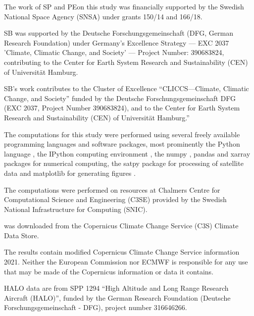 \documentclass[journal abbreviation, manuscript]{copernicus}
\begin{document}
\begin{acknowledgements}

The work of SP and PEon this study was financially supported by the Swedish
National Space Agency (SNSA) under grants 150/14 and 166/18.

SB was supported by the Deutsche Forschungsgemeinschaft (DFG, German Research
Foundation) under Germany's Excellence Strategy --- EXC 2037 'Climate, Climatic
Change, and Society' --- Project Number: 390683824, contributing to the Center
for Earth System Research and Sustainability (CEN) of Universit\"{a}t Hamburg.
 
SB’s work contributes to the Cluster of Excellence “CLICCS—Climate,
Climatic Change, and Society” funded by the Deutsche Forschungsgemeinschaft DFG
(EXC 2037, Project Number 390683824), and to the Center for Earth System Research
and Sustainability (CEN) of Universität Hamburg.”

The computations for this study were performed using several freely available
programming languages and software packages, most prominently the Python
language \citep{python}, the IPython computing environment \citep{ipython}, the
numpy \citep{numpy}, pandas \citep{pandas} and xarray \citep{xarray} packages
for numerical computing, the satpy package \citep{satpy} for processing of
satellite data and matplotlib for generating figures \citep{matplotlib}.

The computations were performed on resources at Chalmers Centre for
Computational Science and Engineering (C3SE) provided by the Swedish National
Infrastructure for Computing (SNIC).

\citet{era5} was downloaded from the Copernicus Climate Change Service (C3S)
Climate Data Store.

The results contain modified Copernicus Climate Change Service information 2021.
Neither the European Commission nor ECMWF is responsible for any use that may be
made of the Copernicus information or data it contains.

HALO data are from SPP 1294 “High Altitude and Long Range Research Aircraft
(HALO)”, funded by the German Research Foundation (Deutsche
Forschungsgemeinschaft - DFG), project number 316646266.

\end{acknowledgements}





\end{document}
